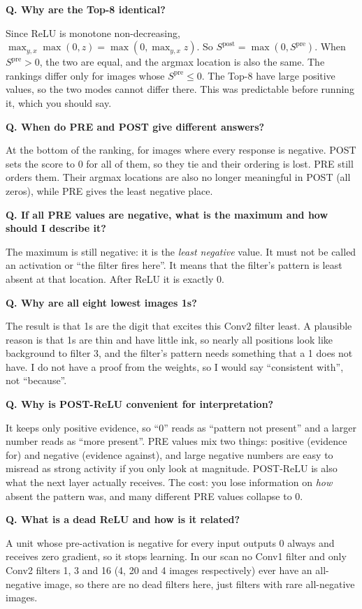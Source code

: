 \documentclass[11pt]{article}
\newcommand{\Q}[1]{\par\vspace{4pt}\noindent\textcolor{qcol}{\textbf{Q. #1}}\par\nopagebreak}
\newcommand{\A}[1]{\noindent #1\par}
\begin{document}
\Q{Why are the Top-8 identical?}
\A{Since ReLU is monotone non-decreasing, $\max_{y,x}\max(0,z)=\max(0,\max_{y,x}z)$. So $S^{\text{post}}=\max(0,S^{\text{pre}})$. When $S^{\text{pre}}>0$, the two are equal, and the argmax location is also the same. The rankings differ only for images whose $S^{\text{pre}}\le0$. The Top-8 have large positive values, so the two modes cannot differ there. This was predictable before running it, which you should say.}

\Q{When do PRE and POST give different answers?}
\A{At the bottom of the ranking, for images where every response is negative. POST sets the score to 0 for all of them, so they tie and their ordering is lost. PRE still orders them. Their argmax locations are also no longer meaningful in POST (all zeros), while PRE gives the least negative place.}

\Q{If all PRE values are negative, what is the maximum and how should I describe it?}
\A{The maximum is still negative: it is the \emph{least negative} value. It must not be called an activation or ``the filter fires here''. It means that the filter's pattern is least absent at that location. After ReLU it is exactly 0.}

\Q{Why are all eight lowest images 1s?}
\A{The result is that 1s are the digit that excites this Conv2 filter least. A plausible reason is that 1s are thin and have little ink, so nearly all positions look like background to filter 3, and the filter's pattern needs something that a 1 does not have. I do not have a proof from the weights, so I would say ``consistent with'', not ``because''.}

\Q{Why is POST-ReLU convenient for interpretation?}
\A{It keeps only positive evidence, so ``0'' reads as ``pattern not present'' and a larger number reads as ``more present''. PRE values mix two things: positive (evidence for) and negative (evidence against), and large negative numbers are easy to misread as strong activity if you only look at magnitude. POST-ReLU is also what the next layer actually receives. The cost: you lose information on \emph{how} absent the pattern was, and many different PRE values collapse to 0.}

\Q{What is a dead ReLU and how is it related?}
\A{A unit whose pre-activation is negative for every input outputs 0 always and receives zero gradient, so it stops learning. In our scan no Conv1 filter and only Conv2 filters 1, 3 and 16 (4, 20 and 4 images respectively) ever have an all-negative image, so there are no dead filters here, just filters with rare all-negative images.}
\end{document}
